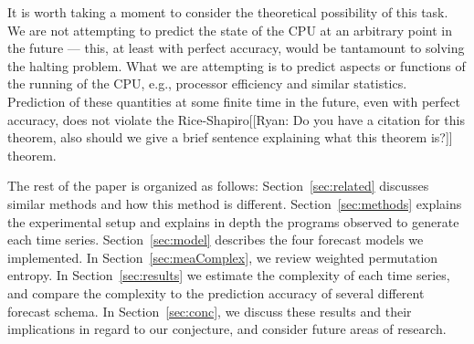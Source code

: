 
It is worth taking a moment to consider the theoretical possibility of
this task. We are not attempting to predict the state of the CPU at an
arbitrary point in the future --- this, at least with perfect
accuracy, would be tantamount to solving the halting problem. What we
are attempting is to predict aspects or functions of the running of
the CPU, e.g., processor efficiency and similar statistics. Prediction of these quantities
at some finite time in the future, even with perfect accuracy, does
not violate the Rice-Shapiro{\color{blue}[[Ryan: Do you have a citation for this theorem, also should we give a brief sentence explaining what this theorem is?]]} theorem.

 The rest of the paper is organized as follows: Section~\ref{sec:related} discusses similar methods and how this method is different. Section~\ref{sec:methods} explains the experimental setup and explains in depth the programs observed to generate each time series. Section~\ref{sec:model} describes the four forecast models we implemented.  In
 Section~\ref{sec:meaComplex}, we review weighted permutation entropy. In Section~\ref{sec:results} we estimate the complexity of each time series, and
 compare the complexity to the prediction accuracy of several different forecast schema.  In
 Section~\ref{sec:conc}, we discuss these results and their
 implications in regard to our conjecture, and consider future areas of
 research.

